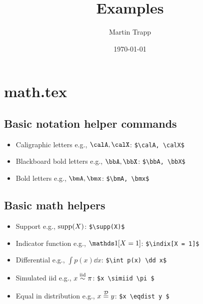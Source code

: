\documentclass[11pt]{article}
\title{Examples}
\author{ Martin Trapp }
\date{\today}
\begin{document}
\maketitle

\section{math.tex}
\subsection{Basic notation helper commands}
\begin{itemize}
        \item Caligraphic letters e.g., $ \calA, \calX $: \verb!$\calA, \calX$!
        \item Blackboard bold letters e.g., $ \bbA, \bbX $: \verb!$\bbA, \bbX$!
        \item Bold letters e.g., $ \bmA, \bmx $: \verb!$\bmA, \bmx$!
\end{itemize}
\subsection{Basic math helpers}
\begin{itemize}
        \item Support e.g., $ \operatorname{supp}(X) $: \verb!$\supp(X)$!
        \item Indicator function e.g., $ \indic[X = 1] $: \verb!$\indix[X = 1]$!
        \item Differential e.g., $ \int p(x) \dd x$: \verb!$\int p(x) \dd x$!
        \item Simulated iid e.g., $ x \overset{\mathrm{iid}}{\sim} \pi$: \verb!$x \simiid \pi $!
        \item Equal in distribution e.g., $ x \overset{\mathcal{D}}{=} y$: \verb!$x \eqdist y $!
\end{itemize}
\end{document}
